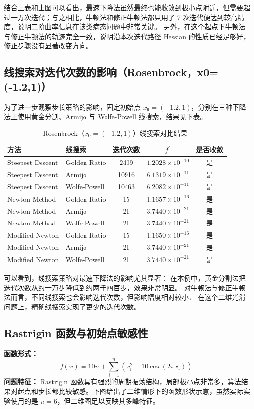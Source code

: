 \documentclass[12pt,a4paper]{ctexart}
\begin{document}
结合上表和上图可以看出，最速下降法虽然最终也能收敛到极小点附近，但需要超过一万次迭代；与之相比，牛顿法和修正牛顿法都只用了 7 次迭代便达到较高精度，说明二阶曲率信息在该类病态问题中非常关键。
另外，在这个起点下牛顿法与修正牛顿法的轨迹完全一致，说明沿本次迭代路径 Hessian 的性质已经足够好，修正步骤没有显著改变方向。

\subsection{线搜索对迭代次数的影响（Rosenbrock，x0=(-1.2,1)）}
为了进一步观察步长策略的影响，固定初始点 $x_0=(-1.2,1)$，分别在三种下降法上使用黄金分割、Armijo 与 Wolfe-Powell 线搜索，结果见下表。

\begin{table}[H]
\centering
\caption{Rosenbrock（$x_0=(-1.2,1)$）线搜索对比结果}
\label{tab:work2_linesearch_compare}
\begin{tabular}{llccc}
\toprule
方法 & 线搜索 & 迭代次数 & $f^\ast$ & 是否收敛 \\
\midrule
Steepest Descent & Golden Ratio & 2409 & $1.2028\times 10^{-10}$ & 是 \\
Steepest Descent & Armijo & 10916 & $6.1319\times 10^{-11}$ & 是 \\
Steepest Descent & Wolfe-Powell & 10463 & $6.2082\times 10^{-11}$ & 是 \\
\midrule
Newton Method & Golden Ratio & 15 & $1.1657\times 10^{-16}$ & 是 \\
Newton Method & Armijo & 21 & $3.7440\times 10^{-21}$ & 是 \\
Newton Method & Wolfe-Powell & 21 & $3.7440\times 10^{-21}$ & 是 \\
\midrule
Modified Newton & Golden Ratio & 15 & $1.1650\times 10^{-16}$ & 是 \\
Modified Newton & Armijo & 21 & $3.7440\times 10^{-21}$ & 是 \\
Modified Newton & Wolfe-Powell & 21 & $3.7440\times 10^{-21}$ & 是 \\
\bottomrule
\end{tabular}
\end{table}

可以看到，线搜索策略对最速下降法的影响尤其显著：
在本例中，黄金分割法把迭代次数从约一万步降低到约两千四百步，效果非常明显。
对牛顿法与修正牛顿法而言，不同线搜索也会影响迭代次数，但影响幅度相对较小，
在这个二维光滑问题上，精确线搜索实现了更少的迭代次数。

\subsection{Rastrigin 函数与初始点敏感性}
\textbf{函数形式：}
\begin{equation}
f(x)=10n+\sum_{i=1}^{n}\left(x_i^2-10\cos(2\pi x_i)\right).
\end{equation}
\textbf{问题特征：} Rastrigin 函数具有强烈的周期振荡结构，局部极小点非常多，算法结果对起点和步长都比较敏感。下图给出了二维情形下的函数形状示意，虽然实际实验使用的是 $n=6$，但二维图足以反映其多峰特征。
\end{document}
